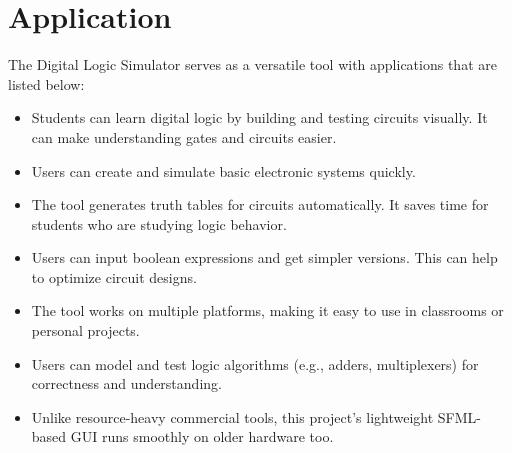 \section{Application}
The Digital Logic Simulator serves as a versatile tool with applications that are listed below:

\begin{itemize}
    \item  Students can learn digital logic by building and testing circuits visually. It can make understanding gates and circuits easier.

    \item  Users can create and simulate basic electronic systems quickly.

    \item  The tool generates truth tables for circuits automatically. It saves time for students who are studying logic behavior.

    \item  Users can input boolean expressions and get simpler versions. This can help to optimize circuit designs.

    \item  The tool works on multiple platforms, making it easy to use in classrooms or personal projects.

    \item  Users can model and test logic algorithms (e.g., adders, multiplexers) for correctness and understanding.

    \item  Unlike resource-heavy commercial tools, this project's lightweight SFML-based GUI runs smoothly on older hardware too.

\end{itemize}
\clearpage